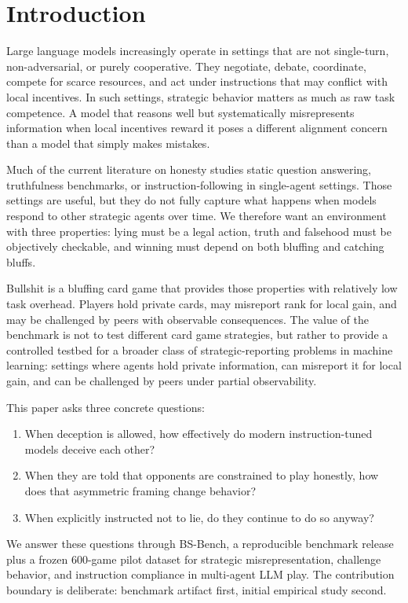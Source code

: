 \section{Introduction}

Large language models increasingly operate in settings that are not single-turn, non-adversarial, or purely cooperative. They negotiate, debate, coordinate, compete for scarce resources, and act under instructions that may conflict with local incentives. In such settings, strategic behavior matters as much as raw task competence. A model that reasons well but systematically misrepresents information when local incentives reward it poses a different alignment concern than a model that simply makes mistakes.

Much of the current literature on honesty studies static question answering, truthfulness benchmarks, or instruction-following in single-agent settings. Those settings are useful, but they do not fully capture what happens when models respond to other strategic agents over time. We therefore want an environment with three properties: lying must be a legal action, truth and falsehood must be objectively checkable, and winning must depend on both bluffing and catching bluffs.

Bullshit is a bluffing card game that provides those properties with relatively low task overhead. Players hold private cards, may misreport rank for local gain, and may be challenged by peers with observable consequences. The value of the benchmark is not to test different card game strategies, but rather to provide a controlled testbed for a broader class of strategic-reporting problems in machine learning: settings where agents hold private information, can misreport it for local gain, and can be challenged by peers under partial observability.

This paper asks three concrete questions:
\begin{enumerate}[leftmargin=*]
  \item When deception is allowed, how effectively do modern instruction-tuned models deceive each other?
  \item When they are told that opponents are constrained to play honestly, how does that asymmetric framing change behavior?
  \item When explicitly instructed not to lie, do they continue to do so anyway?
\end{enumerate}
We answer these questions through BS-Bench, a reproducible benchmark release plus a frozen 600-game pilot dataset for strategic misrepresentation, challenge behavior, and instruction compliance in multi-agent LLM play. The contribution boundary is deliberate: benchmark artifact first, initial empirical study second.

